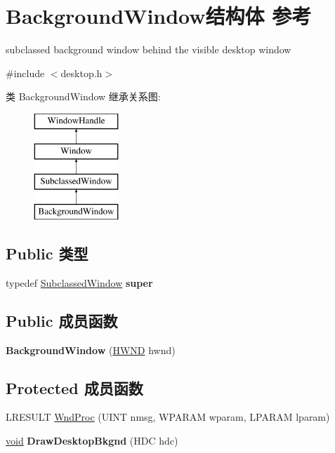 \hypertarget{struct_background_window}{}\section{Background\+Window结构体 参考}
\label{struct_background_window}


subclassed background window behind the visible desktop window  




{\ttfamily \#include $<$desktop.\+h$>$}

类 Background\+Window 继承关系图\+:\begin{figure}[H]
\begin{center}
\leavevmode
\includegraphics[height=4.000000cm]{struct_background_window}
\end{center}
\end{figure}
\subsection*{Public 类型}
\begin{DoxyCompactItemize}
\item 
\mbox{\label{struct_background_window_acac2cb2cde1c88cde8077901011aa59d}} 
typedef \hyperlink{struct_subclassed_window}{Subclassed\+Window} {\bfseries super}
\end{DoxyCompactItemize}
\subsection*{Public 成员函数}
\begin{DoxyCompactItemize}
\item 
\mbox{\label{struct_background_window_ad50fe07e33fb27fdbd8e1bb71e22f126}} 
{\bfseries Background\+Window} (\hyperlink{interfacevoid}{H\+W\+ND} hwnd)
\end{DoxyCompactItemize}
\subsection*{Protected 成员函数}
\begin{DoxyCompactItemize}
\item 
L\+R\+E\+S\+U\+LT \hyperlink{struct_background_window_a53a46176409524ff6f457230e07d3229}{Wnd\+Proc} (U\+I\+NT nmsg, W\+P\+A\+R\+AM wparam, L\+P\+A\+R\+AM lparam)
\item 
\mbox{\label{struct_background_window_a6beb018bb1338e710ff7421a3127767c}} 
\hyperlink{interfacevoid}{void} {\bfseries Draw\+Desktop\+Bkgnd} (H\+DC hdc)
\end{DoxyCompactItemize}
